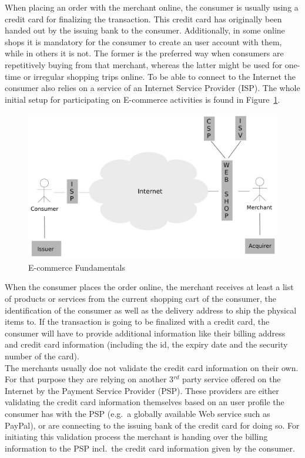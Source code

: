 When placing an order with the merchant online, the consumer is usually using a credit card for finalizing the transaction. This credit card has originally been handed out by the issuing bank to the consumer. Additionally, in some online shops it is mandatory for the consumer to create an user account with them, while in others it is not. The former is the preferred way when consumers are repetitively buying from that merchant, whereas the latter might be used for one-time or irregular shopping trips online. To be able to connect to the Internet the consumer also relies on a service of an Internet Service Provider (\gls{ISP}). The whole initial setup for participating on \gls{E-commerce} activities is found in Figure~\ref{fig:images_ecommerce_scenario}.\@

\begin{figure}[H]
	\centering
		\includegraphics[width=0.9\columnwidth]{images/e-commerce-scenario.pdf}
	\caption{\gls{E-commerce} Fundamentals}
\label{fig:images_ecommerce_scenario}
\end{figure}

When the consumer places the order online, the merchant receives at least a list of products or services from the current shopping cart of the consumer, the identification of the consumer as well as the delivery address to ship the physical items to. If the transaction is going to be finalized with a credit card, the consumer will have to provide additional information like their billing address and credit card information (including the id, the expiry date and the security number of the card). \\

The merchants usually doe not validate the credit card information on their own. For that purpose they are relying on another 3$^{rd}$ party service offered on the Internet by the Payment Service Provider (\gls{PSP}). These providers are either validating the credit card information themselves based on an user profile the consumer has with the \gls{PSP} (e.g.\ a globally available Web service such as PayPal), or are connecting to the issuing bank of the credit card for doing so. For initiating this validation process the merchant is handing over the billing information to the \gls{PSP} incl.\ the credit card information given by the consumer. \\


